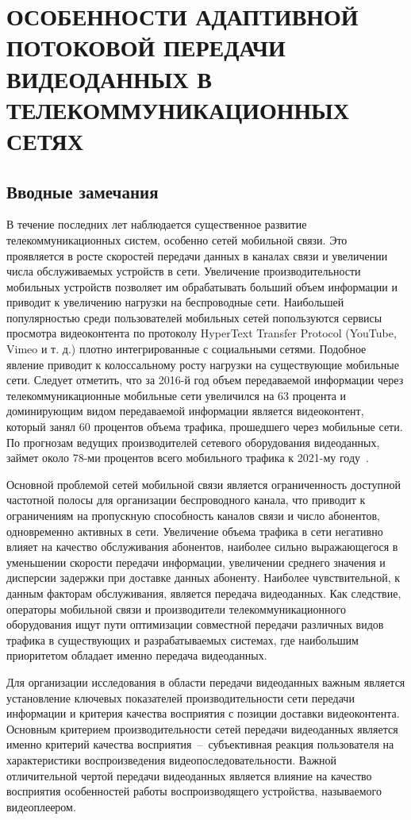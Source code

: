 \newpage
\chapter{ОСОБЕННОСТИ АДАПТИВНОЙ ПОТОКОВОЙ ПЕРЕДАЧИ ВИДЕОДАННЫХ В ТЕЛЕКОММУНИКАЦИОННЫХ СЕТЯХ}
\label{chap1}

\section{Вводные замечания}

В течение последних лет наблюдается существенное развитие телекоммуникационных систем, особенно сетей мобильной связи. Это проявляется в росте скоростей передачи данных в каналах связи и увеличении числа обслуживаемых устройств в сети. Увеличение производительности мобильных устройств позволяет им обрабатывать больший объем информации и приводит к увеличению нагрузки на беспроводные сети. Наибольшей популярностью среди пользователей мобильных сетей попользуются сервисы просмотра видеоконтента по протоколу HyperText Transfer Protocol (YouTube, Vimeo и т. д.) плотно интегрированные с социальными сетями. Подобное явление приводит к колоссальному росту нагрузки на существующие мобильные сети. Следует отметить, что за 2016-й год объем передаваемой информации через телекоммуникационные мобильные сети увеличился на 63 процента и доминирующим видом передаваемой информации является видеоконтент, который занял 60 процентов объема трафика, прошедшего через мобильные сети. По прогнозам ведущих производителей сетевого оборудования видеоданных, займет около 78-ми процентов всего мобильного трафика к 2021-му году~\cite{Cisco}.

Основной проблемой сетей мобильной связи является ограниченность доступной частотной полосы для организации беспроводного канала, что приводит к ограничениям на пропускную способность каналов связи и число абонентов, одновременно активных в сети. Увеличение объема трафика в сети негативно влияет на качество обслуживания абонентов, наиболее сильно выражающегося в уменьшении скорости передачи информации, увеличении среднего значения и дисперсии задержки при доставке данных абоненту. Наиболее чувствительной, к данным факторам обслуживания, является передача видеоданных. Как следствие, операторы мобильной связи и производители телекоммуникационного оборудования ищут пути оптимизации совместной передачи различных видов трафика в существующих и разрабатываемых системах, где наибольшим приоритетом обладает именно передача видеоданных.

Для организации исследования в области передачи видеоданных важным является установление ключевых показателей производительности сети передачи информации и критерия качества восприятия с позиции доставки видеоконтента. Основным критерием производительности сетей передачи видеоданных является именно критерий качества восприятия~--~субъективная реакция пользователя на характеристики воспроизведения видеопоследовательности. Важной отличительной чертой передачи видеоданных является влияние на качество восприятия особенностей работы воспроизводящего устройства, называемого видеоплеером.


